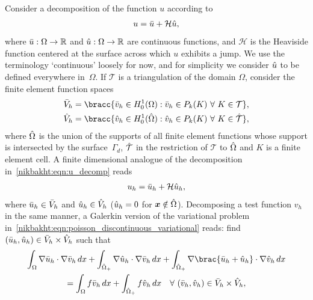 Consider a decomposition of the function $u$ according to
%
\begin{equation}
  u = \Bar{u} + \mathcal{H} \Hat{u},
\label{nikbakht:eqn:u_decomp}
\end{equation}
%
where $\Bar{u}: \Omega \rightarrow \mathbb{R}$ and $\Hat{u}: \Omega
\rightarrow \mathbb{R}$ are continuous functions, and $\mathcal{H}$ is
the Heaviside function centered at the surface across which $u$ exhibits
a jump.  We use the terminology `continuous' loosely for now, and for
simplicity we consider $\Hat{u}$ to be defined everywhere in~$\Omega$.
If $\mathcal{T}$ is a triangulation of the domain $\Omega$, consider
the finite element function spaces
%
\begin{align}
  \Bar{V}_{h} &= \bracc{\Bar{v}_{h} \in H^{1}_{0}(\Omega)
                    : \Bar{v}_{h} \in P_{k}(K) \ \forall \ K \in \mathcal{T}},
\\
  \Hat{V}_{h} &= \bracc{\Hat{v}_{h} \in H^{1}_{0}(\Hat{\Omega})
                    : \Hat{v}_{h} \in P_{k}(K) \ \forall \ K \in \Hat{\mathcal{T}}},
\end{align}
%
where $\Hat{\Omega}$ is the union of the supports of all finite element
functions whose support is intersected by the surface~$\Gamma_{d}$,
$\Hat{\mathcal{T}}$ in the restriction of $\mathcal{T}$ to $\Hat{\Omega}$
and $K$ is a finite element cell.  A finite dimensional analogue of the
decomposition in~\eqref{nikbakht:eqn:u_decomp} reads
%
\begin{equation}
  u_{h} = \Bar{u}_{h} + \mathcal{H} \Hat{u}_{h},
  \label{nikbakht:eqn:u_h_decomp}
\end{equation}
%
where $\Bar{u}_{h} \in \Bar{V}_{h}$ and $\Hat{u}_{h} \in \Hat{V}_{h}$
($\Hat{u}_{h} = 0$ for $\boldsymbol{x} \notin \Hat{\Omega}$).
Decomposing a test function $v_{h}$ in the same manner,
a Galerkin version of the variational problem
in~\eqref{nikbakht:eqn:poisson_discontinuous_variational} reads: find
$(\Bar{u}_{h}, \Hat{u}_{h}) \in \Bar{V}_{h} \times \Hat{V}_{h}$ such that
%
\begin{multline}
     \int_{\Omega} \nabla \Bar{u}_{h} \cdot \nabla \Bar{v}_{h} \dif x
     + \int_{\Hat{\Omega}_{+}} \nabla \Hat{u}_{h} \cdot  \nabla \Bar{v}_{h} \dif x
     + \int_{\Hat{\Omega}_{+}}  \nabla \brac{\Bar{u}_{h} + \Hat{u}_{h}} \cdot \nabla \Hat{v}_{h} \dif x
\\
  =
   \int_{\Omega} f \Bar{v}_{h} \dif x
 + \int_{\Hat{\Omega}_{+}}  f \Hat{v}_{h} \dif x
      \quad \forall \ (\Bar{v}_{h}, \Hat{v}_{h}) \in \Bar{V}_{h} \times \Hat{V}_{h},
\label{nikbakht:eqn:poisson_expanded_discontinuous_variational}
\end{multline}
